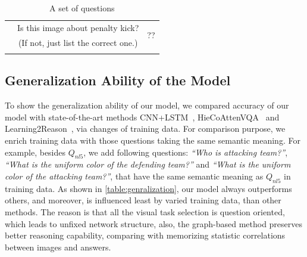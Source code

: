 \begin{table}[thb]
\begin{center}
\begin{tabular}{c|c|c}
{			\multirow{2}{*}{$Q_{nl_{11}}$}  &   Is this image about penalty kick?  &  \multirow{2}{*}{\color{red}??}    \\ 
			& {\color{red}(If not, just list the correct one.)}  &  \\ %
			\Xhline{1pt}
			}
		\end{tabular}
		\caption{A set of questions}
		\label{table:questions}
	\end{center}
\end{table}


\subsection{Generalization Ability of the Model}

To show the generalization ability of our model, we compared accuracy of our model with state-of-the-art methods CNN+LSTM~\cite{VQA}, HieCoAttenVQA~\cite{Lu2016Hie} and Learning2Reason~\cite{hu2017learning}, via changes of training data. For comparison purpose, we enrich training data with those questions taking the same semantic meaning. For example, besides $Q_{nl5}$, we add following questions: \textit{``Who is attacking team?''}, \textit{``What is the uniform color of the defending team?''} and \textit{``What is the uniform color of the attacking team?''}, that have the same semantic meaning as $Q_{nl5}$ in training data. As shown in \cref{table:genralization}, our model always outperforms others, and moreover, is influenced least by varied training data, than other methods. The reason is that all the visual task selection is question oriented, which leads to unfixed network structure, also, the graph-based method preserves better reasoning capability, comparing with memorizing statistic correlations between images and answers.



